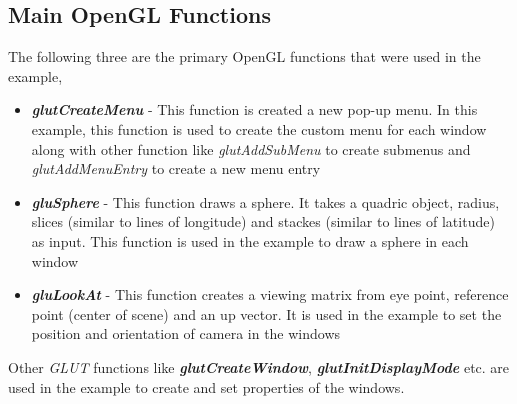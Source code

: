 \documentclass[11pt,a4paper,oneside]{article}
\begin{document}
   \subsection{Main OpenGL Functions}
   The following three are the primary OpenGL functions that were used in the example,
    \begin{itemize}
   	\item \textbf{\emph{glutCreateMenu}} - This function is created a new pop-up menu. In this example, this function is used to create the custom menu for each window along with other function like \emph{glutAddSubMenu} to create submenus and \emph{glutAddMenuEntry} to create a new menu entry
   	\item \textbf{\emph{gluSphere}} - This function draws a sphere. It takes a quadric object, radius, slices (similar to lines of longitude) and stackes (similar to lines of latitude) as input. This function is used in the example to draw a sphere in each window
   	\item \textbf{\emph{gluLookAt}} - This function creates a viewing matrix from eye point, reference point (center of scene) and an up vector. It is used in the example to set the position and orientation of camera in the windows
   \end{itemize}
    Other \emph{GLUT} functions like \textbf{\emph{glutCreateWindow}}, \textbf{\emph{glutInitDisplayMode}} etc. are used in the example to create and set properties of the windows.
   
\end{document}

